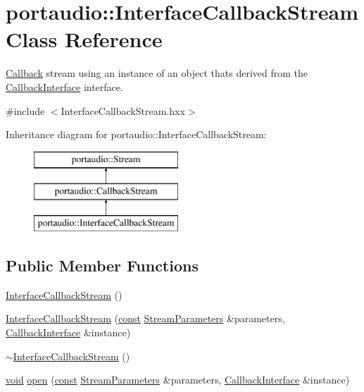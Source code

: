 \hypertarget{classportaudio_1_1_interface_callback_stream}{}\section{portaudio\+:\+:Interface\+Callback\+Stream Class Reference}
\label{classportaudio_1_1_interface_callback_stream}


\hyperlink{class_callback}{Callback} stream using an instance of an object that\textquotesingle{}s derived from the \hyperlink{classportaudio_1_1_callback_interface}{Callback\+Interface} interface.  




{\ttfamily \#include $<$Interface\+Callback\+Stream.\+hxx$>$}

Inheritance diagram for portaudio\+:\+:Interface\+Callback\+Stream\+:\begin{figure}[H]
\begin{center}
\leavevmode
\includegraphics[height=3.000000cm]{classportaudio_1_1_interface_callback_stream}
\end{center}
\end{figure}
\subsection*{Public Member Functions}
\begin{DoxyCompactItemize}
\item 
\hyperlink{classportaudio_1_1_interface_callback_stream_a9ce5a2330fba78b2725a0fc5b7df42d6}{Interface\+Callback\+Stream} ()
\item 
\hyperlink{classportaudio_1_1_interface_callback_stream_a4ef529133f724ee5147057f8b76ccd22}{Interface\+Callback\+Stream} (\hyperlink{getopt1_8c_a2c212835823e3c54a8ab6d95c652660e}{const} \hyperlink{classportaudio_1_1_stream_parameters}{Stream\+Parameters} \&parameters, \hyperlink{classportaudio_1_1_callback_interface}{Callback\+Interface} \&instance)
\item 
\hyperlink{classportaudio_1_1_interface_callback_stream_abc76e9e357f5fe108adb7f926aa99543}{$\sim$\+Interface\+Callback\+Stream} ()
\item 
\hyperlink{sound_8c_ae35f5844602719cf66324f4de2a658b3}{void} \hyperlink{classportaudio_1_1_interface_callback_stream_abc911699a048ae0a9c0cb8a6c3a39521}{open} (\hyperlink{getopt1_8c_a2c212835823e3c54a8ab6d95c652660e}{const} \hyperlink{classportaudio_1_1_stream_parameters}{Stream\+Parameters} \&parameters, \hyperlink{classportaudio_1_1_callback_interface}{Callback\+Interface} \&instance)
\end{DoxyCompactItemize}
